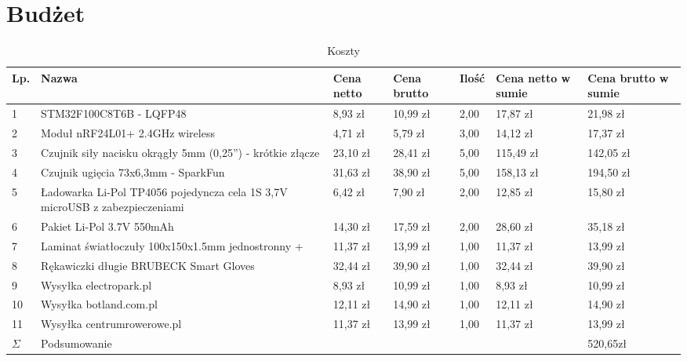 \section{Budżet}
\label{sec:budzet} %
\begin{table}[hbt]
\begin{center}
\begin{tabular}{|l|p{5cm}|p{1.4cm}|p{1.4cm}|l|p{1.6cm}|p{1.6cm}|}
\hline 
Lp. & Nazwa & Cena netto & Cena brutto & Ilość & Cena netto w sumie & Cena brutto w sumie \\ \hline
1	&STM32F100C8T6B - LQFP48	 &8,93  zł 	 &10,99  zł 	&2,00	 &17,87  zł 	 &21,98  zł \\ \hline
2	&Moduł nRF24L01+ 2.4GHz wireless	 &4,71  zł 	 &5,79  zł 	&3,00	 &14,12  zł 	 &17,37  zł \\ \hline
3	&Czujnik siły nacisku okrągły 5mm (0,25'') - krótkie złącze	 &23,10  zł 	 &28,41  zł 	&5,00	 &115,49  zł 	 &142,05  zł \\ \hline
4	&Czujnik ugięcia 73x6,3mm - SparkFun	 &31,63  zł 	 &38,90  zł 	&5,00	 &158,13  zł 	 &194,50  zł \\ \hline
5	&Ładowarka Li-Pol TP4056 pojedyncza cela 1S 3,7V microUSB z zabezpieczeniami	 &6,42  zł 	 &7,90  zł 	&2,00	 &12,85  zł 	 &15,80  zł \\ \hline
6	&Pakiet Li-Pol 3.7V 550mAh	 &14,30  zł 	 &17,59  zł 	&2,00	 &28,60  zł 	 &35,18  zł \\ \hline
7	&Laminat światłoczuły 100x150x1.5mm jednostronny +	 &11,37  zł 	 &13,99  zł 	&1,00	 &11,37  zł 	 &13,99  zł \\ \hline
8	&Rękawiczki długie BRUBECK Smart Gloves	 &32,44  zł 	 &39,90  zł 	&1,00	 &32,44  zł 	 &39,90  zł \\ \hline
9	&Wysyłka electropark.pl	 &8,93  zł 	 &10,99  zł 	&1,00	 &8,93  zł 	 &10,99  zł \\ \hline
10	&Wysyłka botland.com.pl	 &12,11  zł 	 &14,90  zł 	&1,00	 &12,11  zł 	 &14,90  zł \\ \hline
11	&Wysyłka centrumrowerowe.pl	 &11,37  zł 	 &13,99  zł 	&1,00	 &11,37  zł 	 &13,99  zł   \\ \hline 
$\Sigma$ & Podsumowanie & & & & & 520,65zł\\ \hline        
\end{tabular}
\end{center}
\caption{\label{rj}Koszty} %
\end{table}
\begin{flushleft}
\end{flushleft}


